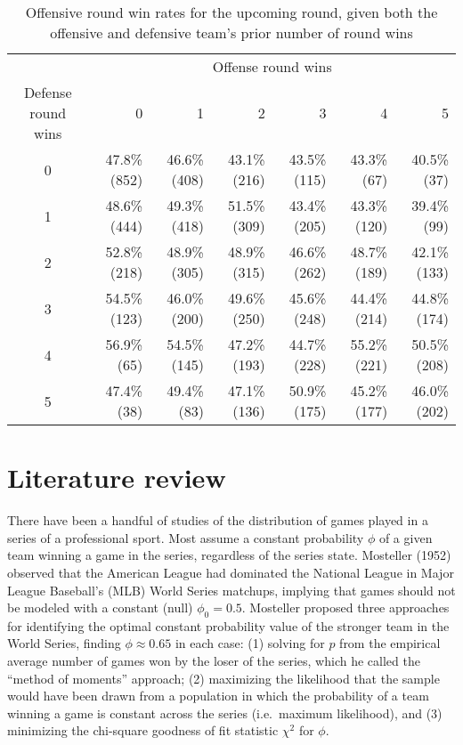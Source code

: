 \documentclass{article}
\begin{document}
\begin{longtable}{crrrrrr}
\caption{Offensive round win rates for the upcoming round, given both the offensive and defensive team's prior number of round wins}\label{tbl:cod-o-win-prop-by-series-state} \\
\toprule
& \multicolumn{6}{c}{Offense round wins} \\ 
\cmidrule(lr){2-7}
Defense round wins & 0 & 1 & 2 & 3 & 4 & 5 \\ 
\midrule
0 & 47.8\%
(852) & 46.6\%
(408) & 43.1\%
(216) & 43.5\%
(115) & 43.3\%
(67) & 40.5\%
(37) \\ 
1 & 48.6\%
(444) & 49.3\%
(418) & 51.5\%
(309) & 43.4\%
(205) & 43.3\%
(120) & 39.4\%
(99) \\ 
2 & 52.8\%
(218) & 48.9\%
(305) & 48.9\%
(315) & 46.6\%
(262) & 48.7\%
(189) & 42.1\%
(133) \\ 
3 & 54.5\%
(123) & 46.0\%
(200) & 49.6\%
(250) & 45.6\%
(248) & 44.4\%
(214) & 44.8\%
(174) \\ 
4 & 56.9\%
(65) & 54.5\%
(145) & 47.2\%
(193) & 44.7\%
(228) & 55.2\%
(221) & 50.5\%
(208) \\ 
5 & 47.4\%
(38) & 49.4\%
(83) & 47.1\%
(136) & 50.9\%
(175) & 45.2\%
(177) & 46.0\%
(202) \\ 
\bottomrule
\end{longtable}

\hypertarget{literature-review}{%
\section{Literature review}\label{literature-review}}

There have been a handful of studies of the distribution of games played
in a series of a professional sport. Most assume a constant probability
\(\phi\) of a given team winning a game in the series, regardless of the
series state. Mosteller (1952) observed that the American League had
dominated the National League in Major League Baseball's (MLB) World
Series matchups, implying that games should not be modeled with a
constant (null) \(\phi_0 = 0.5\). Mosteller proposed three approaches
for identifying the optimal constant probability value of the stronger
team in the World Series, finding \(\phi \approx 0.65\) in each case:
(1) solving for \(p\) from the empirical average number of games won by
the loser of the series, which he called the ``method of moments''
approach; (2) maximizing the likelihood that the sample would have been
drawn from a population in which the probability of a team winning a
game is constant across the series (i.e.~maximum likelihood), and (3)
minimizing the chi-square goodness of fit statistic \(\chi^2\) for
\(\phi\).
\end{document}

